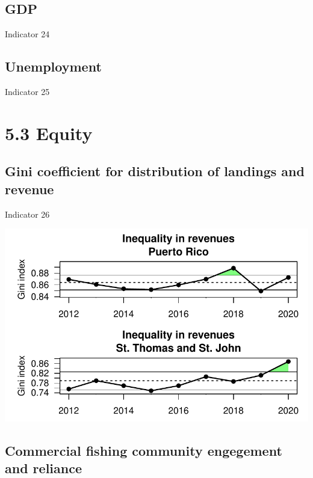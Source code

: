 \documentclass[
  letterpaper,
  oneside,
  open=any]{scrbook}
\begin{document}
\hypertarget{gdp}{%
\subsection{GDP}\label{gdp}}

Indicator 24

\hypertarget{unemployment}{%
\subsection{Unemployment}\label{unemployment}}

Indicator 25

\hypertarget{equity}{%
\section{5.3 Equity}\label{equity}}

\hypertarget{gini-coefficient-for-distribution-of-landings-and-revenue}{%
\subsection{Gini coefficient for distribution of landings and
revenue}\label{gini-coefficient-for-distribution-of-landings-and-revenue}}

Indicator 26

\includegraphics{Report_book_files/Performance_indicators_files/figure-pdf/unnamed-chunk-3-1.pdf}

\hypertarget{commercial-fishing-community-engegement-and-reliance}{%
\subsection{Commercial fishing community engegement and
reliance}\label{commercial-fishing-community-engegement-and-reliance}}
\end{document}
